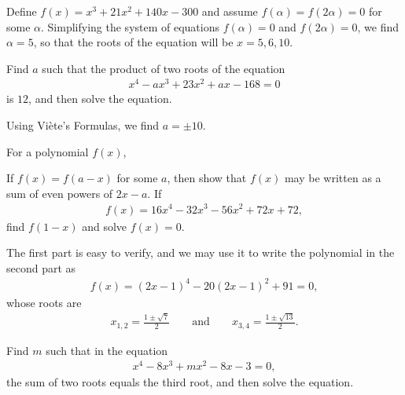 \begin{solution}
    Define $f(x)=x^3+21x^2+140x-300$ and assume $f(\alpha)=f(2\alpha)=0$ for some $\alpha$. Simplifying the system of equations $f(\alpha)=0$ and $f(2\alpha)=0$, we find $\alpha=5$, so that the roots of the equation will be $x=5,6,10$.
\end{solution}


\begin{question}
    Find $a$ such that the product of two roots of the equation
    \begin{align*}
        x^4-ax^3+23x^2+ax-168=0
    \end{align*}
    is $12$, and then solve the equation.
\end{question}

\begin{solution}
    Using Viète's Formulas, we find $a=\pm 10$.
\end{solution}


\begin{question}
    For a polynomial $f(x)$,
    \begin{tasks}
        \task If $f(x)=f(a-x)$ for some $a$, then show that $f(x)$ may be written as a sum of even powers of $2x-a$.
        \task If 
        \begin{align*}
            f(x) = 16x^4 - 32x^3 - 56x^2 + 72x + 72,
        \end{align*}
        find $f(1-x)$ and solve $f(x)=0$.
    \end{tasks}
\end{question}

\begin{solution}
    The first part is easy to verify, and we may use it to write the polynomial in the second part as
    \begin{align*}
        f(x) = (2x-1)^4 - 20(2x-1)^2 + 91 = 0,
    \end{align*}
    whose roots are
    \begin{align*}
        x_{1,2} = \frac{1\pm\sqrt{7}}{2} \qquad \text{and} \qquad x_{3,4} = \frac{1\pm\sqrt{13}}{2}.
    \end{align*}
\end{solution}


\begin{question}
    Find $m$ such that in the equation
    \begin{align*}
        x^4 - 8x^3 + mx^2 - 8x - 3 =0,
    \end{align*}
    the sum of two roots equals the third root, and then solve the equation.
\end{question}

